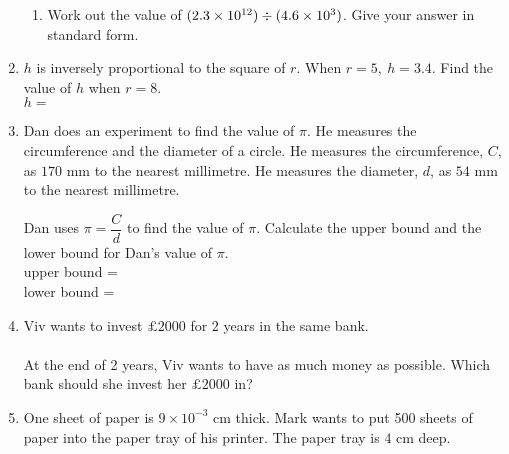 \begin{enumerate}
\begin{enumerate}
    \item Work out the value of $(2.3 \times 10^{12}) \divisionsymbol (4.6 \times 10^3)$. Give your answer in standard form.\\[2cm]\vspace*{0pt}\hfill\dline
  \end{enumerate}
  \item $h$ is inversely proportional to the square of $r$. When $r = 5,\ h = 3.4$. Find the value of $h$ when $r = 8$.\\[2.5cm]\vspace*{0pt}\hfill$h=$\dline
  \item Dan does an experiment to find the value of $\pi$. He measures the circumference and the diameter of a circle. He measures the circumference, $C$, as $170$ mm to the nearest millimetre. He measures the diameter, $d$, as $54$ mm to the nearest millimetre.\par 
  Dan uses $\pi = \dfrac{C}{d}$ to find the value of $\pi$. Calculate the upper bound and the lower bound for Dan's value of $\pi$.\\[3cm]
  \vspace*{0pt}\hfill upper bound = \dline\\
  \vspace*{0pt}\hfill lower bound = \dline
  \item Viv wants to invest $\pounds 2000$ for $2$ years in the same bank.\\[0.5cm]
  \hfill
    \\[0.5cm]
    At the end of 2 years, Viv wants to have as much money as possible. Which bank should she invest her $\pounds 2000$ in?
    \newpage
    \item One sheet of paper is $9 \times 10^{-3}$ cm thick. Mark wants to put 500 sheets of paper into the paper tray of his printer. The paper tray is $4$ cm deep.\par 

\end{enumerate}
